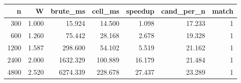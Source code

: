 \begin{tabular}{rrrrrrr}
\toprule
n & W & brute_ms & cell_ms & speedup & cand_per_n & match \\
\midrule
300 & 1.000 & 15.924 & 14.500 & 1.098 & 17.233 & 1 \\
600 & 1.260 & 75.442 & 28.168 & 2.678 & 19.328 & 1 \\
1200 & 1.587 & 298.600 & 54.102 & 5.519 & 21.162 & 1 \\
2400 & 2.000 & 1632.329 & 100.889 & 16.179 & 21.484 & 1 \\
4800 & 2.520 & 6274.339 & 228.678 & 27.437 & 23.289 & 1 \\
\bottomrule
\end{tabular}
